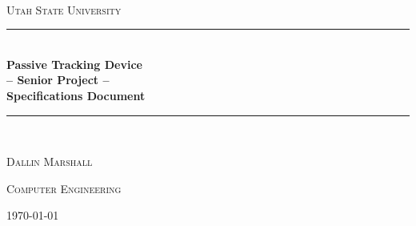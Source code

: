\documentclass[11pt]{article}
\begin{document}
\newcommand{\HRule}{\rule{\linewidth}{0.5mm}}

\begin{titlepage}
\begin{center}

~\\[4cm]

\textsc{\Large \textsc{Utah State University} }\\[0.5cm]

\HRule \\[0.4cm]
{ \huge \bfseries Passive Tracking Device \\ -- Senior Project -- \\ Specifications Document \\[0.4cm] }

\HRule \\[1.5cm]

\noindent
\begin{minipage}{0.4\textwidth}
\begin{flushleft} \large
\textsc{ Dallin Marshall }
\end{flushleft}
\end{minipage}%
\begin{minipage}{0.4\textwidth}
\begin{flushright} \large
\textsc{ Computer Engineering }
\end{flushright}
\end{minipage}

\vfill

{\large \today}

\end{center}
\end{titlepage}
\end{document}
